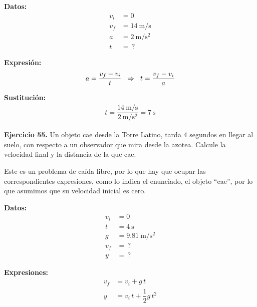 \documentclass[14pt]{extarticle}
\begin{document}
\vspace*{0.3cm}
\begin{minipage}[t]{0.4\linewidth}
\textbf{Datos:}
\begin{align*}
v_{i} &= 0 \\
v_{f} &= \SI{14}{\meter\per\second} \\
a &= \SI{2}{\meter\per\square\second} \\
t &= \, ?
\end{align*}
\end{minipage}
\begin{minipage}[t]{0.4\linewidth}
\textbf{Expresión:}
\begin{align*}
a = \dfrac{v_{f} - v_{i}}{t} \hspace{0.2cm} \Rightarrow \hspace{0.2cm} t = \dfrac{v_{f} - v_{i}}{a}
\end{align*}
\end{minipage}

\vspace*{0.3cm}
\textbf{Sustitución:}
\begin{align*}
t = \dfrac{\displaystyle \SI[per-mode=fraction]{14}{\meter\per\second}}{\displaystyle \SI[per-mode=fraction]{2}{\meter\per\square\second}} = \SI{7}{\second}
\end{align*}


\vspace*{0.3cm}
\textbf{Ejercicio 55. } Un objeto cae desde la Torre Latino, tarda \num{4} segundos en llegar al suelo, con respecto a un observador que mira desde la azotea. Calcule la velocidad final y la distancia de la que cae.

\vspace*{0.3cm}
Este es un problema de caída libre, por lo que hay que ocupar las correspondientes expresiones, como lo indica el enunciado, el objeto \enquote{cae}, por lo que asumimos que su velocidad inicial es cero.

\vspace*{0.3cm}
\begin{minipage}[t]{0.4\linewidth}
\textbf{Datos:}
\begin{align*}
v_{i} &= 0 \\
t &= \SI{4}{\second} \\
g &= \SI{9.81}{\meter\per\square\second} \\
v_{f} &= \, ? \\
y &= \, ?
\end{align*}
\end{minipage}
\begin{minipage}[t]{0.4\linewidth}
\textbf{Expresiones:}
\begin{align*}
v_{f} &= v_{i} + g \, t \\
y &= v_{i} \, t + \dfrac{1}{2} g \, t^{2}
\end{align*}
\end{minipage}
\end{document}
